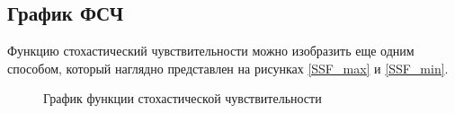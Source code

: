 \subsection{График ФСЧ}
        
    Функцию стохастический чувствительности можно изобразить еще одним способом, который наглядно представлен на рисунках \ref{SSF_max} и \ref{SSF_min}.

    \begin{figure}
        \centering
        
            
        \caption{График функции стохастической чувствительности}
    \end{figure}
